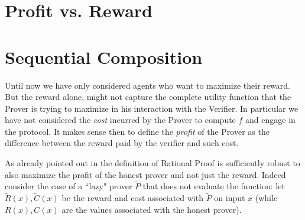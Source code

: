 
%

%

%

\section{Profit vs. Reward}


\section{Sequential Composition}
Until now we have only considered agents who want to maximize their reward. But the reward alone, might not capture the complete utility function that the Prover is trying to maximize in his interaction with the Verifier. In particular we have not considered the 
{\em cost} incurred by the Prover to compute $f$ and engage in the protocol. It makes 
sense then to define the  {\em profit} of the Prover as the difference between the reward paid by the verifier and such cost. 


As already pointed out in \cite{am1,ratargs} the definition of Rational Proof is sufficiently robust to also maximize the profit of the honest prover and not just the reward. Indeed consider the case of a ``lazy" prover $\tilde{P}$ that does not evaluate the function: let $\tilde{R}(x), \tilde{C}(x)$ be the reward and cost associated with $\tilde{P}$ on input $x$ (while $R(x),C(x)$ are the values associated with the honest prover). 

